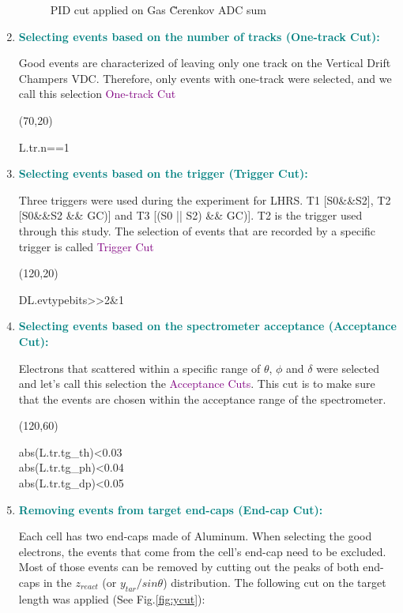 \documentclass[11pt]{article}
\begin{document}
\begin{enumerate}
\begin{figure}[H]
  \caption{PID cut applied on Gas \~Cerenkov ADC sum}
  \label{fig:cer}
\end{figure}
 \item{\textcolor{teal}{\textbf{Selecting events based on the number of tracks (One-track Cut): }}}\par
 Good events are characterized of leaving only one track on the Vertical Drift Champers VDC. Therefore, only events with one-track were selected, and we call this selection \textcolor{purple}{One-track Cut}
 \begin{center}
\framebox(70,20){%
    \parbox{50\unitlength}{L.tr.n==1}%
}
\end{center}
 \item{\textcolor{teal}{\textbf{Selecting events based on the trigger (Trigger Cut): }}}\par
Three triggers were used during the experiment for LHRS. T1 [S0\&\&S2],  T2 [S0\&\&S2 \&\& GC)] and  T3 [(S0 || S2) \&\& GC)]. T2 is the trigger used through this study. The selection of events that are recorded by a specific trigger is called \textcolor{purple}{Trigger Cut}
  \begin{center}
\framebox(120,20){%
    \parbox{90\unitlength}{DL.evtypebits>>2\&1}%
}
\end{center}
 \item{\textcolor{teal}{\textbf{Selecting events based on the spectrometer acceptance (Acceptance Cut): }}}\par
Electrons that scattered within a specific range of $\theta$, $\phi$ and $\delta$ were selected and let's call this selection the \textcolor{purple}{Acceptance Cuts}. This cut is to make sure that the events are chosen within the acceptance range of the spectrometer. 
 \begin{center}
\framebox(120,60){%
    \parbox{110\unitlength}{abs(L.tr.tg\_th)<0.03\\abs(L.tr.tg\_ph)<0.04\\abs(L.tr.tg\_dp)<0.05}%
}
\end{center}
 \item{\textcolor{teal}{\textbf{Removing events from target end-caps (End-cap Cut): }}}\par
Each cell has two end-caps made of Aluminum. When selecting the good electrons, the events that come from the cell's end-cap need to be excluded. Most of those events can be removed by cutting out the peaks of both end-caps in the $z_{react}$ (or $y_{tar}/sin\theta$) distribution. The following cut on the target length was applied (See Fig.\ref{fig:ycut}):\par

\end{enumerate}
\end{document}
